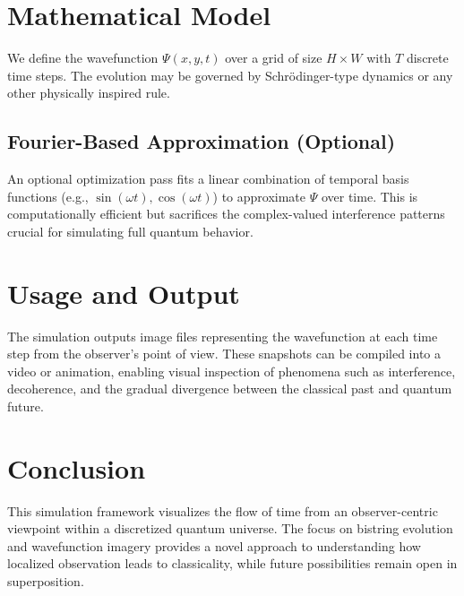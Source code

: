 \documentclass{article}
\begin{document}
\section{Mathematical Model}

We define the wavefunction $\Psi(x, y, t)$ over a grid of size $H \times W$ with $T$ discrete time steps. The evolution may be governed by Schrödinger-type dynamics or any other physically inspired rule.

\subsection{Fourier-Based Approximation (Optional)}
An optional optimization pass fits a linear combination of temporal basis functions (e.g., $\sin(\omega t), \cos(\omega t)$) to approximate $\Psi$ over time. This is computationally efficient but sacrifices the complex-valued interference patterns crucial for simulating full quantum behavior.

\section{Usage and Output}

The simulation outputs image files representing the wavefunction at each time step from the observer's point of view. These snapshots can be compiled into a video or animation, enabling visual inspection of phenomena such as interference, decoherence, and the gradual divergence between the classical past and quantum future.

\section{Conclusion}

This simulation framework visualizes the flow of time from an observer-centric viewpoint within a discretized quantum universe. The focus on bistring evolution and wavefunction imagery provides a novel approach to understanding how localized observation leads to classicality, while future possibilities remain open in superposition.
\end{document}

